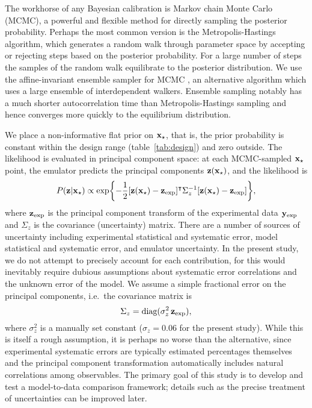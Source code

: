 \documentclass[aps,prc,reprint,amsmath]{revtex4-1}
\newcommand{\tran}{^\intercal}
\begin{document}
The workhorse of any Bayesian calibration is Markov chain Monte Carlo (MCMC), a powerful and flexible method for directly sampling the posterior probability.
Perhaps the most common version is the Metropolis-Hastings algorithm, which generates a random walk through parameter space by accepting or rejecting steps based on the posterior probability.
For a large number of steps the samples of the random walk equilibrate to the posterior distribution.
We use the affine-invariant ensemble sampler for MCMC \cite{Goodman:2010en,FM:2013mc}, an alternative algorithm which uses a large ensemble of interdependent walkers.
Ensemble sampling notably has a much shorter autocorrelation time than Metropolis-Hastings sampling and hence converges  more quickly to the equilibrium distribution. 

We place a non-informative flat prior on $\mathbf x_\star$, that is, the prior probability is constant within the design range (table~\ref{tab:design}) and zero outside.
The likelihood is evaluated in principal component space:
at each MCMC-sampled $\mathbf x_\star$ point, the emulator predicts the principal components $\mathbf z(\mathbf x_\star)$, and the likelihood is
\begin{equation}
  P(\z|\xs) \propto \exp\biggl\{ -\frac{1}{2} [\z(\xs) - \zexp]\tran \Sigma_z^{-1} [\z(\xs) - \zexp] \biggr\},
  \label{eq:likelihood}
\end{equation}
where $\mathbf z_\text{exp}$ is the principal component transform of the experimental data $\mathbf y_\text{exp}$ and $\Sigma_z$ is the covariance (uncertainty) matrix.
There are a number of sources of uncertainty including experimental statistical and systematic error, model statistical and systematic error, and emulator uncertainty.
In the present study, we do not attempt to precisely account for each contribution, for this would inevitably require dubious assumptions about systematic error correlations and the unknown error of the model.
We assume a simple fractional error on the principal components, i.e.\ the covariance matrix is
\begin{equation}
  \Sigma_z = \text{diag}(\sigma^2_z\,\mathbf z_\text{exp}),
\end{equation}
where $\sigma^2_z$ is a manually set constant ($\sigma_z = 0.06$ for the present study).
While this is itself a rough assumption, it is perhaps no worse than the alternative, since experimental systematic errors are typically estimated percentages themselves and the principal component transformation automatically includes natural correlations among observables.
The primary goal of this study is to develop and test a model-to-data comparison framework; details such as the precise treatment of uncertainties can be improved later.
\end{document}

